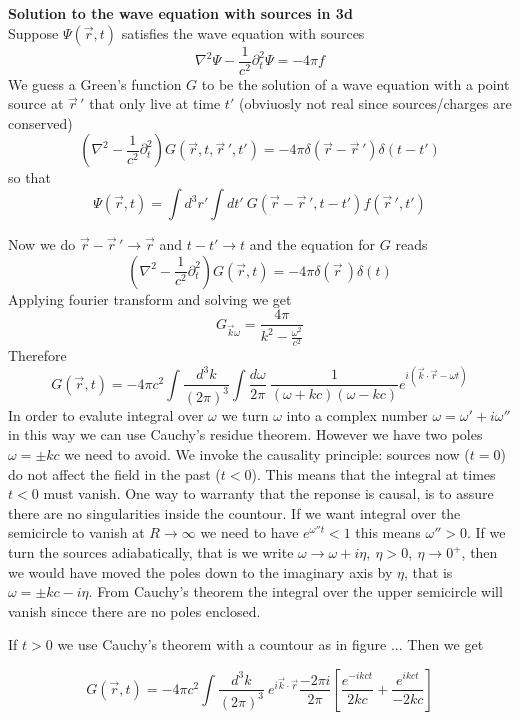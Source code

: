 \documentclass[12pt,a4paper]{article}
\begin{document}
\textbf{Solution to the wave equation with sources in 3d}\\
Suppose $\Psi(\vec{r},t)$ satisfies the wave equation with sources
\begin{equation}
	\nabla^2 \Psi - \frac{1}{c^2}\partial_t^2 \Psi = -4\pi f 
\end{equation}
We guess a Green's function $G$ to be the solution of a wave equation with a point source at $\vec{r}\,'$ that only live at time $t'$ (obviuosly not real since sources/charges are conserved)
\begin{equation}
	\left( \nabla^2 - \frac{1}{c^2}\partial_t^2\right)G(\vec{r},t,\vec{r}\,',t') = - 4\pi \delta(\vec{r}-\vec{r}\,')\delta(t-t')
\end{equation}
so that
\begin{equation}
	\Psi(\vec{r},t) = \int d^3r' \int dt' \ G(\vec{r}-\vec{r}\,',t-t') f(\vec{r}\,',t')
\end{equation}


Now we do $\vec{r}-\vec{r}\,' \to \vec{r} $  and $t-t' \to t$ and the equation for $G$ reads
\begin{equation}
	\left( \nabla^2 - \frac{1}{c^2}\partial_t^2\right)G(\vec{r},t) = - 4\pi \delta(\vec{r}\,)\delta(t)
\end{equation}
Applying fourier transform and solving we get
\begin{equation}
	G_{\vec{k}\omega} = \frac{4\pi}{k^2 - \frac{\omega^2}{c^2}}
\end{equation}
Therefore
\begin{equation}
	G(\vec{r},t) = -4\pi c^2 \int \frac{d^3k}{(2\pi)^3}\int \frac{d\omega}{2\pi} \ \frac{1}{(\omega + kc)(\omega -kc)}e^{i(\vec{k}\cdot\vec{r}-\omega t)}
\end{equation}
In order to evalute integral over $\omega$ we turn $\omega$ into a complex number $\omega = \omega' + i\omega''$ in this way we can use Cauchy's residue theorem.  However we have two poles $\omega = \pm kc$ we need to avoid. We invoke the causality principle: sources now ($t = 0$) do not affect the field in the past ($t<0$). This means that the integral at times $t<0$ must vanish. One way to warranty that the reponse is causal, is to assure there are no singularities inside the countour.
If we want integral over the semicircle to vanish at $R\to\infty$ we need to have $e^{\omega''t}<1$ this means $\omega'' > 0$. 
 If we turn the sources adiabatically, that is we write $\omega \to \omega+ i\eta, \ \eta >0, \ \eta \to 0^+$, then we would have moved the poles down to the imaginary axis by $\eta$, that is $\omega = \pm kc - i\eta$. From Cauchy's theorem the integral over the upper semicircle will vanish sincce there are no poles enclosed.   

If $t>0$ we use Cauchy's theorem with a countour as in figure ...
Then we get

\begin{equation}
	G(\vec{r},t) = -4\pi c^2 \int \frac{d^3k} {(2\pi)^3}\ e^{i\vec{k}\cdot\vec{r}} \frac{-2\pi i}{2\pi}\left[\frac{e^{-ikct}}{2kc}+ \frac{e^{ikct}}{-2kc}\right]
\end{equation}
	
\end{document}
